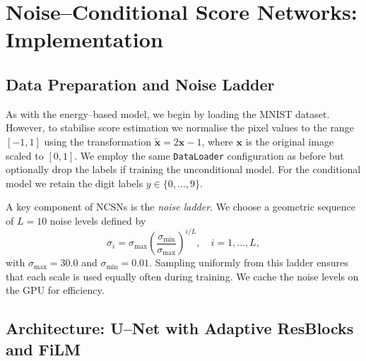 

\section{Noise--Conditional Score Networks: Implementation}

\subsection{Data Preparation and Noise Ladder}

As with the energy–based model, we begin by loading the MNIST dataset.
However, to stabilise score estimation we normalise the pixel values to
the range $[-1,1]$ using the transformation $\tilde{\mathbf{x}} = 2\mathbf{x}
- 1$, where $\mathbf{x}$ is the original image scaled to $[0,1]$.  We
employ the same \texttt{DataLoader} configuration as before but
optionally drop the labels if training the unconditional model.  For the
conditional model we retain the digit labels $y\in\{0,\dots,9\}$.

A key component of NCSNs is the \emph{noise ladder}.  We choose a
geometric sequence of $L=10$ noise levels defined by
\begin{equation}
    \sigma_i = \sigma_{\max} \left(\frac{\sigma_{\min}}{\sigma_{\max}}\right)^{i/L},
    \quad i=1,\dots,L,
    \label{eq:sigma-schedule}
\end{equation}
with $\sigma_{\max}=30.0$ and $\sigma_{\min}=0.01$.  Sampling uniformly
from this ladder ensures that each scale is used equally often during
training.  We cache the noise levels on the GPU for efficiency.

\subsection{Architecture: U--Net with Adaptive ResBlocks and FiLM}

